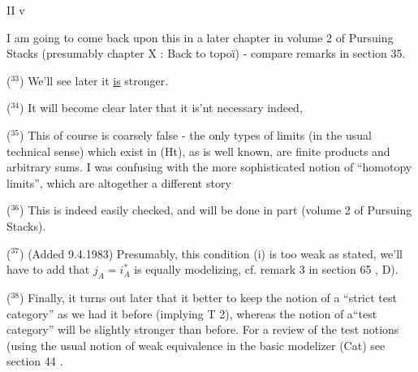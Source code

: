 II v

I am going to come back upon this in a later chapter in volume 2 of
Pursuing Stacks (presumably chapter X : Back to topoï) - compare remarks
in section 35.

($^{33}$) We'll see later it \uline{is} stronger.

($^{34}$) It will become clear later  that it is'nt necessary indeed,  

(\hand{!}$^{35}$) This of course is  coarsely false - the only types of 
limits (in the usual technical sense) which exist in (Ht), as is well
known, are finite products and arbitrary sums. I was confusing with the
more sophisticated notion of ``homotopy limits'', which are altogether a
different story\hand{!}

($^{36}$) This is indeed easily checked, and will be done in part 
(volume 2 of Pursuing Stacks).

($^{37}$) (Added 9.4.1983) Presumably, this condition (i) is too weak as
stated, we'll have to add that $j_A=i_A^{*}$ is equally modelizing, cf. remark
3 in  section 65 , D).

($^{38}$) Finally, it turns out later  that it  better to keep the notion
of a ``strict test category'' as we had it before (implying T 2), whereas
the notion of a``test category'' will be  slightly stronger than
before. For a  review of the test notions (using the usual notion of weak
equivalence in the basic modelizer (Cat)\hand{),} see section 44 .

